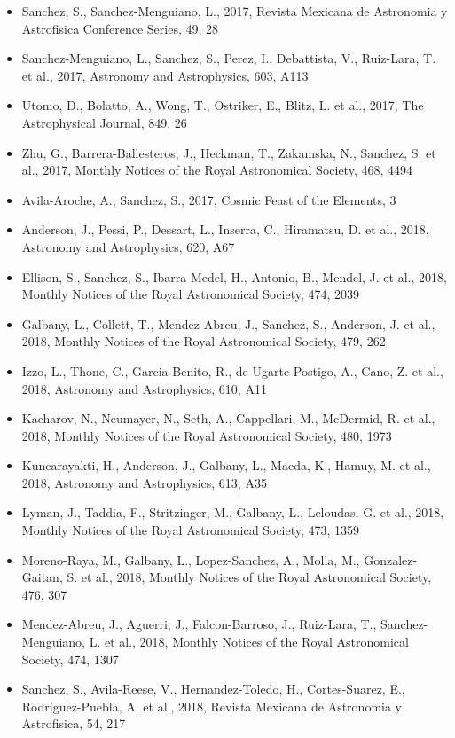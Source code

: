 \documentclass{letter}
\begin{document}
\begin{enumerate}
\begin{itemize}
\item Sanchez, S., Sanchez-Menguiano, L., 2017, Revista Mexicana de Astronomia y Astrofisica Conference Series, 49, 28
\item Sanchez-Menguiano, L., Sanchez, S., Perez, I., Debattista, V., Ruiz-Lara, T. et al., 2017, Astronomy and Astrophysics, 603, A113
\item Utomo, D., Bolatto, A., Wong, T., Ostriker, E., Blitz, L. et al., 2017, The Astrophysical Journal, 849, 26
\item Zhu, G., Barrera-Ballesteros, J., Heckman, T., Zakamska, N., Sanchez, S. et al., 2017, Monthly Notices of the Royal Astronomical Society, 468, 4494
\item Avila-Aroche, A., Sanchez, S., 2017, Cosmic Feast of the Elements, 3
\item Anderson, J., Pessi, P., Dessart, L., Inserra, C., Hiramatsu, D. et al., 2018, Astronomy and Astrophysics, 620, A67
\item Ellison, S., Sanchez, S., Ibarra-Medel, H., Antonio, B., Mendel, J. et al., 2018, Monthly Notices of the Royal Astronomical Society, 474, 2039
\item Galbany, L., Collett, T., Mendez-Abreu, J., Sanchez, S., Anderson, J. et al., 2018, Monthly Notices of the Royal Astronomical Society, 479, 262
\item Izzo, L., Thone, C., Garcia-Benito, R., de Ugarte Postigo, A., Cano, Z. et al., 2018, Astronomy and Astrophysics, 610, A11
\item Kacharov, N., Neumayer, N., Seth, A., Cappellari, M., McDermid, R. et al., 2018, Monthly Notices of the Royal Astronomical Society, 480, 1973
\item Kuncarayakti, H., Anderson, J., Galbany, L., Maeda, K., Hamuy, M. et al., 2018, Astronomy and Astrophysics, 613, A35
\item Lyman, J., Taddia, F., Stritzinger, M., Galbany, L., Leloudas, G. et al., 2018, Monthly Notices of the Royal Astronomical Society, 473, 1359
\item Moreno-Raya, M., Galbany, L., Lopez-Sanchez, A., Molla, M., Gonzalez-Gaitan, S. et al., 2018, Monthly Notices of the Royal Astronomical Society, 476, 307
\item Mendez-Abreu, J., Aguerri, J., Falcon-Barroso, J., Ruiz-Lara, T., Sanchez-Menguiano, L. et al., 2018, Monthly Notices of the Royal Astronomical Society, 474, 1307
\item Sanchez, S., Avila-Reese, V., Hernandez-Toledo, H., Cortes-Suarez, E., Rodriguez-Puebla, A. et al., 2018, Revista Mexicana de Astronomia y Astrofisica, 54, 217

\end{itemize}
\end{enumerate}
\end{document}
